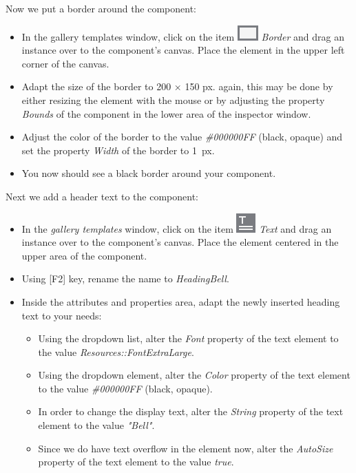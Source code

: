 \documentclass[
  a4paper,
,tablecaptionabove
]{scrbook}
\begin{document}
Now we put a border around the component:

\begin{itemize}
\item
  In the gallery templates window, click on the item
  \includegraphics{./../asciidoc/modules/ROOT/assets/images/icons/BorderIcon.png}
  \emph{Border} and drag an instance over to the component's canvas.
  Place the element in the upper left corner of the canvas.
\item
  Adapt the size of the border to 200 × 150 px. again, this may be done
  by either resizing the element with the mouse or by adjusting the
  property \emph{Bounds} of the component in the lower area of the
  inspector window.
\item
  Adjust the color of the border to the value \emph{\#000000FF} (black,
  opaque) and set the property \emph{Width} of the border to 1~px.
\item
  You now should see a black border around your component.
\end{itemize}

Next we add a header text to the component:

\begin{itemize}
\item
  In the \emph{gallery templates} window, click on the item
  \includegraphics[scale=0.75]{./../asciidoc/modules/ROOT/assets/images/icons/TextViewIcon.png}
  \emph{Text} and drag an instance over to the component's canvas. Place
  the element centered in the upper area of the component.
\item
  Using {[}F2{]} key, rename the name to \emph{HeadingBell}.
\item
  Inside the attributes and properties area, adapt the newly inserted
  heading text to your needs:

  \begin{itemize}
  \item
    Using the dropdown list, alter the \emph{Font} property of the text
    element to the value \emph{Resources::FontExtraLarge}.
  \item
    Using the dropdown element, alter the \emph{Color} property of the
    text element to the value \emph{\#000000FF} (black, opaque).
  \item
    In order to change the display text, alter the \emph{String}
    property of the text element to the value \emph{"Bell"}.
  \item
    Since we do have text overflow in the element now, alter the
    \emph{AutoSize} property of the text element to the value
    \emph{true}.
  \end{itemize}
\end{itemize}
\end{document}
